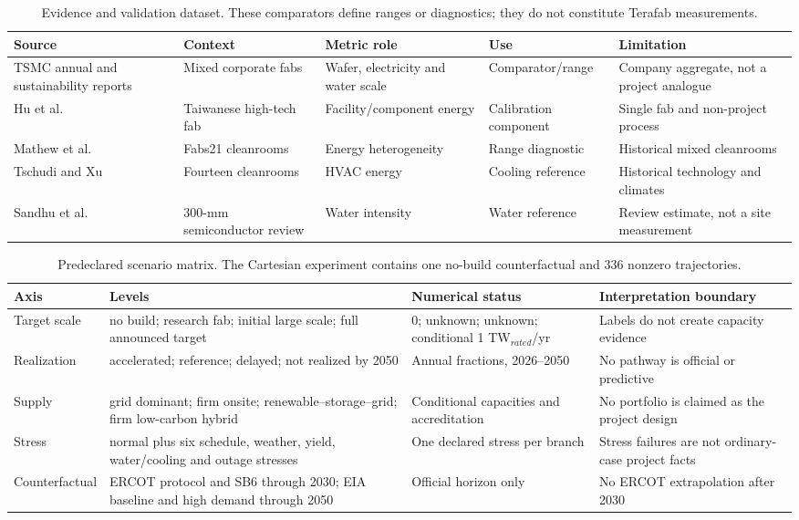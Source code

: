 \begin{table}[htbp]
\centering
\caption{Evidence and validation dataset. These comparators define ranges or
diagnostics; they do not constitute Terafab measurements.}
\label{tab:evidence}
\small
\begin{tabularx}{\textwidth}{p{}p{}p{}X p{}}
\toprule
Source & Context & Metric role & Use & Limitation \\
\midrule
TSMC annual and sustainability reports & Mixed corporate fabs & Wafer, electricity and water scale & Comparator/range & Company aggregate, not a project analogue \\
Hu et al. \cite{Hu2019} & Taiwanese high-tech fab & Facility/component energy & Calibration component & Single fab and non-project process \\
Mathew et al. \cite{Mathew2010} & Fabs21 cleanrooms & Energy heterogeneity & Range diagnostic & Historical mixed cleanrooms \\
Tschudi and Xu \cite{Tschudi2003} & Fourteen cleanrooms & HVAC energy & Cooling reference & Historical technology and climates \\
Sandhu et al. \cite{Sandhu2025} & 300-mm semiconductor review & Water intensity & Water reference & Review estimate, not a site measurement \\
\bottomrule
\end{tabularx}
\end{table}

\begin{table}[htbp]
\centering
\caption{Predeclared scenario matrix. The Cartesian experiment contains one
no-build counterfactual and 336 nonzero trajectories.}
\label{tab:matrix}
\small
\begin{tabularx}{\textwidth}{p{}p{}p{}X}
\toprule
Axis & Levels & Numerical status & Interpretation boundary \\
\midrule
Target scale & no build; research fab; initial large scale; full announced target & 0; unknown; unknown; conditional 1 TW$_{rated}$/yr & Labels do not create capacity evidence \\
Realization & accelerated; reference; delayed; not realized by 2050 & Annual fractions, 2026--2050 & No pathway is official or predictive \\
Supply & grid dominant; firm onsite; renewable--storage--grid; firm low-carbon hybrid & Conditional capacities and accreditation & No portfolio is claimed as the project design \\
Stress & normal plus six schedule, weather, yield, water/cooling and outage stresses & One declared stress per branch & Stress failures are not ordinary-case project facts \\
Counterfactual & ERCOT protocol and SB6 through 2030; EIA baseline and high demand through 2050 & Official horizon only & No ERCOT extrapolation after 2030 \\
\bottomrule
\end{tabularx}
\end{table}

